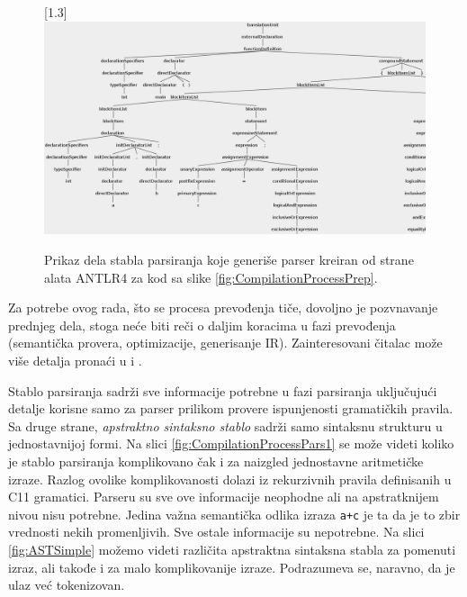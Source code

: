 \begin{figure}[h!]
    \centering
    \scalebox{0.95}[1.3] {
        \includegraphics[width=\textwidth]{images/parse_tree.png}
    }
    \caption{Prikaz dela stabla parsiranja koje generiše parser kreiran od strane alata ANTLR4 za kod sa slike \ref{fig:CompilationProcessPrep}.}
    \label{fig:CompilationProcessPars}
\end{figure}

Za potrebe ovog rada, što se procesa prevođenja tiče, dovoljno je pozvnavanje prednjeg dela, stoga neće biti reči o daljim koracima u fazi prevođenja (semantička provera, optimizacije, generisanje IR). Zainteresovani čitalac može više detalja pronaći u \cite{EngineeringCompilers} i \cite{CompilerConstruction}. 

Stablo parsiranja sadrži sve informacije potrebne u fazi parsiranja uključujući detalje korisne samo za parser prilikom provere ispunjenosti gramatičkih pravila. Sa druge strane, \emph{apstraktno sintaksno stablo} sadrži samo sintaksnu strukturu u jednostavnijoj formi. Na slici \ref{fig:CompilationProcessPars1} se može videti koliko je stablo parsiranja komplikovano čak i za naizgled jednostavne aritmetičke izraze. Razlog ovolike komplikovanosti dolazi iz rekurzivnih pravila definisanih u C11 gramatici. Parseru su sve ove informacije neophodne ali na apstratknijem nivou nisu potrebne. Jedina važna semantička odlika izraza \texttt{a+c} je ta da je to zbir vrednosti nekih promenljivih. Sve ostale informacije su nepotrebne. Na slici \ref{fig:ASTSimple} možemo videti različita apstraktna sintaksna stabla za pomenuti izraz, ali takođe i za malo komplikovanije izraze. Podrazumeva se, naravno, da je ulaz već tokenizovan. 

